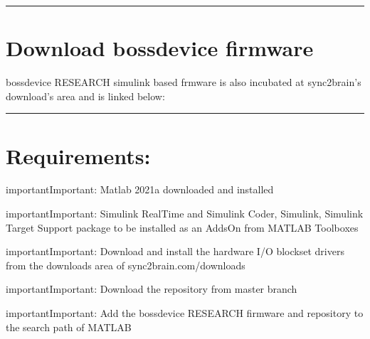 \documentclass[letterpaper,10pt,english]{sphinxmanual}
\begin{document}
\bigskip\hrule\bigskip



\section{Download bossdevice firmware}
\label{\detokenize{6_downloads_n_dependencies:download-bossdevice-firmware}}
\sphinxAtStartPar
bossdevice RESEARCH simulink based frmware is also incubated at sync2brain’s download’s area and is linked below:

\begin{sphinxVerbatim}[commandchars=\\\{\}]
\end{sphinxVerbatim}


\bigskip\hrule\bigskip



\section{Requirements:}
\label{\detokenize{6_downloads_n_dependencies:requirements}}
\begin{sphinxadmonition}{important}{Important:}
\sphinxAtStartPar
Matlab 2021a downloaded and installed
\end{sphinxadmonition}

\begin{sphinxadmonition}{important}{Important:}
\sphinxAtStartPar
Simulink Real\sphinxhyphen{}Time and Simulink Coder, Simulink, Simulink Target Support package to be installed as an Adds\sphinxhyphen{}On from MATLAB Toolboxes
\end{sphinxadmonition}

\begin{sphinxadmonition}{important}{Important:}
\sphinxAtStartPar
Download and install the hardware I/O blockset drivers from the downloads area of sync2brain.com/downloads
\end{sphinxadmonition}

\begin{sphinxadmonition}{important}{Important:}
\sphinxAtStartPar
Download the repository from master branch
\end{sphinxadmonition}

\begin{sphinxadmonition}{important}{Important:}
\sphinxAtStartPar
Add the bossdevice RESEARCH firmware and repository to the search path of MATLAB
\end{sphinxadmonition}
\end{document}
